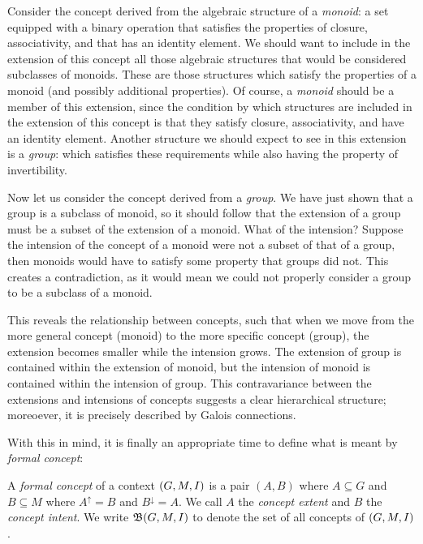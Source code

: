 Consider the concept derived from the algebraic structure of a \textit{monoid}:
a set equipped with a binary operation that satisfies the properties of closure,
associativity, and that has an identity element. We should want to include in the
extension of this concept all those algebraic structures that would be considered
subclasses of monoids. These are those structures which satisfy the properties
of a monoid (and possibly additional properties). Of course, a \textit{monoid} should
be a member of this extension, since the condition by which structures are
included in the extension of this concept is that they satisfy closure, associativity,
and have an identity element. Another structure we should expect to see in this extension
is a \textit{group}: which satisfies these requirements while also having the property
of invertibility.

Now let us consider the concept derived from a \textit{group}. We have just shown
that a group is a subclass of monoid, so it should follow that the extension of
a group must be a subset of the extension of a monoid. What of the intension?
Suppose the intension of the concept of a monoid were not a subset of that of a
group, then monoids would have to satisfy some property that groups did not.
This creates a contradiction, as it would mean we could not properly consider a group
to be a subclass of a monoid.

This reveals the relationship between concepts, such that when we move from the
more general concept (monoid) to the more specific concept (group), the extension
becomes smaller while the intension grows. The extension of group is contained
within the extension of monoid, but the intension of monoid is contained within the
intension of group. This contravariance between the extensions and intensions of
concepts suggests a clear hierarchical structure; moreoever, it is precisely
described by Galois connections.

With this in mind, it is finally an appropriate time to define what is meant by \textit{formal
concept}:

\begin{definition}
    \label{definition:formal-concept}
  A \emph{formal concept} of a context $(G,M,\mathrel{I})$ is a pair $(A,B)$ where
  $A \subseteq G$ and $B\subseteq M$ where $A^{\uparrow}= B$ and
  $B^{\downarrow}= A$. We call $A$ the \emph{concept extent} and $B$ the \emph{concept
  intent}. We write ${\mathfrak B} (G,M,\mathrel{I})$ to denote the set of all concepts of $(G,M,\mathrel{I})$.
\end{definition}

